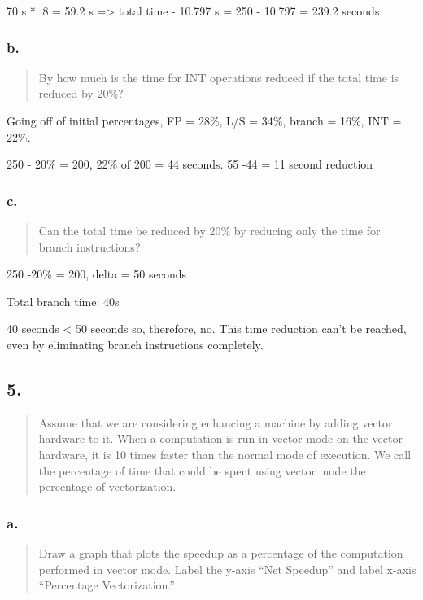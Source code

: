 \documentclass[]{article}
\begin{document}
70 s * .8 = 59.2 s =\textgreater{} total time - 10.797 s = 250 - 10.797
= 239.2 seconds

\subsubsection{b.}\label{header-n5084}

\begin{quote}
By how much is the time for INT operations reduced if the total time is
reduced by 20\%?
\end{quote}

Going off of initial percentages, FP = 28\%, L/S = 34\%, branch = 16\%,
INT = 22\%.

250 - 20\% = 200, 22\% of 200 = 44 seconds. 55 -44 = 11 second reduction

\subsubsection{c.}\label{header-n5092}

\begin{quote}
Can the total time be reduced by 20\% by reducing only the time for
branch instructions?
\end{quote}

250 -20\% = 200, delta = 50 seconds

Total branch time: 40s

40 seconds \textless{} 50 seconds so, therefore, no. This time reduction
can't be reached, even by eliminating branch instructions completely.

\subsection{5.}\label{header-n5102}

\begin{quote}
Assume that we are considering enhancing a machine by adding vector
hardware to it. When a computation is run in vector mode on the vector
hardware, it is 10 times faster than the normal mode of execution. We
call the percentage of time that could be spent using vector mode the
percentage of vectorization.
\end{quote}

\subsubsection{a.}\label{header-n5106}

\begin{quote}
Draw a graph that plots the speedup as a percentage of the computation
performed in vector mode. Label the y-axis ``Net Speedup'' and label
x-axis ``Percentage Vectorization.''
\end{quote}
\end{document}
